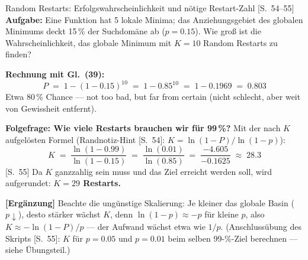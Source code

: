 \begin{bspbox}{Random Restarts: Erfolgswahrscheinlichkeit und nötige Restart-Zahl [S.~54--55]}
\textbf{Aufgabe:} Eine Funktion hat 5 lokale Minima; das Anziehungsgebiet des globalen
Minimums deckt 15\,\% der Suchdomäne ab ($p = 0.15$). Wie gro{\ss} ist die
Wahrscheinlichkeit, das globale Minimum mit $K = 10$ Random Restarts zu finden?

\medskip
\textbf{Rechnung mit Gl.~(39):}
\[
  P \;=\; 1 - (1 - 0.15)^{10} \;=\; 1 - 0.85^{10} \;=\; 1 - 0.1969 \;=\; 0.803
\]
Etwa 80\,\% Chance --- \glqq not too bad, but far from certain\grqq{} (nicht schlecht,
aber weit von Gewissheit entfernt).

\medskip
\textbf{Folgefrage: Wie viele Restarts brauchen wir für 99\,\%?} Mit der nach $K$
aufgelösten Formel (Randnotiz-Hint [S.~54]: $K = \ln(1-P)/\ln(1-p)$):
\[
  K \;=\; \frac{\ln(1 - 0.99)}{\ln(1 - 0.15)} \;=\; \frac{\ln(0.01)}{\ln(0.85)}
    \;=\; \frac{-4.605}{-0.1625} \;\approx\; 28.3
\]
[S.~55] Da $K$ ganzzahlig sein muss und das Ziel erreicht werden soll, wird
aufgerundet: \textbf{$K = 29$ Restarts.}

\medskip
\textbf{[Ergänzung]} Beachte die ungünstige Skalierung: Je kleiner das globale Basin
($p \downarrow$), desto stärker wächst $K$, denn $\ln(1-p) \approx -p$ für kleine $p$,
also $K \approx -\ln(1-P)/p$ --- der Aufwand wächst etwa wie $1/p$.
(Anschlussübung des Skripts [S.~55]: $K$ für $p = 0.05$ und $p = 0.01$ beim selben
99-\%-Ziel berechnen --- siehe Übungsteil.)
\end{bspbox}


